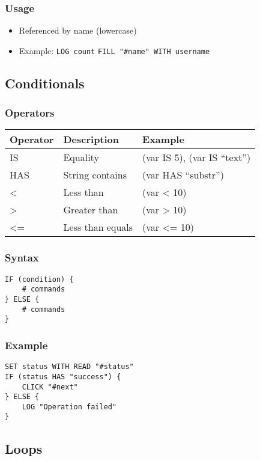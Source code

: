 \documentclass[11pt]{article}
\begin{document}
\subsubsection{Usage}
\label{sec:org456738f}
\begin{itemize}
\item Referenced by name (lowercase)
\item Example: \texttt{LOG count} \texttt{FILL "\#name" WITH username}
\end{itemize}
\subsection{Conditionals}
\label{sec:org4717a7b}
\subsubsection{Operators}
\label{sec:org1e4b3ae}
\begin{center}
\begin{tabular}{lll}
Operator & Description & Example\\
\hline
IS & Equality & (var IS 5), (var IS ``text'')\\
HAS & String contains & (var HAS ``substr'')\\
< & Less than & (var < 10)\\
> & Greater than & (var > 10)\\
<= & Less than equals & (var <= 10)\\
\end{tabular}
\end{center}
\subsubsection{Syntax}
\label{sec:org9d2b4f3}
\begin{verbatim}
IF (condition) {
    # commands
} ELSE {
    # commands
}
\end{verbatim}
\subsubsection{Example}
\label{sec:orgcb13e04}
\begin{verbatim}
SET status WITH READ "#status"
IF (status HAS "success") {
    CLICK "#next"
} ELSE {
    LOG "Operation failed"
}
\end{verbatim}
\subsection{Loops}
\label{sec:org2e6134c}
\end{document}

